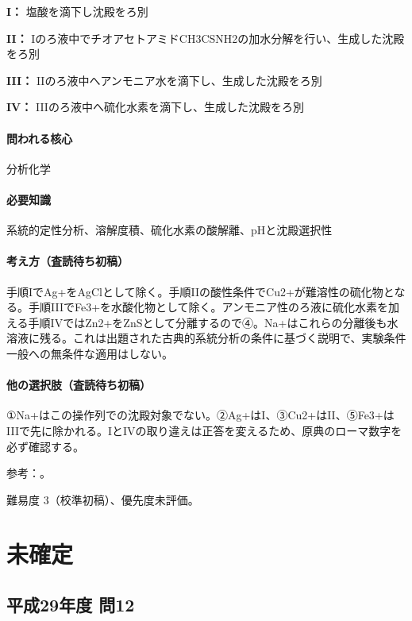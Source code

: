 \noindent\textbf{I：} 塩酸を滴下し沈殿をろ別\par

\noindent\textbf{II：} Iのろ液中でチオアセトアミドCH3CSNH2の加水分解を行い、生成した沈殿をろ別\par

\noindent\textbf{III：} IIのろ液中へアンモニア水を滴下し、生成した沈殿をろ別\par

\noindent\textbf{IV：} IIIのろ液中へ硫化水素を滴下し、生成した沈殿をろ別\par

\paragraph{問われる核心} 分析化学

\paragraph{必要知識} 系統的定性分析、溶解度積、硫化水素の酸解離、pHと沈殿選択性

\paragraph{考え方（査読待ち初稿）} 手順IでAg+をAgClとして除く。手順IIの酸性条件でCu2+が難溶性の硫化物となる。手順IIIでFe3+を水酸化物として除く。アンモニア性のろ液に硫化水素を加える手順IVではZn2+をZnSとして分離するので④。Na+はこれらの分離後も水溶液に残る。これは出題された古典的系統分析の条件に基づく説明で、実験条件一般への無条件な適用はしない。

\paragraph{他の選択肢（査読待ち初稿）} ①Na+はこの操作列での沈殿対象でない。②Ag+はI、③Cu2+はII、⑤Fe3+はIIIで先に除かれる。IとIVの取り違えは正答を変えるため、原典のローマ数字を必ず確認する。

\par 参考：\cite{qualitative_stanford}。

\par 難易度 3（校準初稿）、優先度未評価。

\section{未確定}

\subsection{平成29年度 問12}
\label{q:h29-reg-applied-12}

